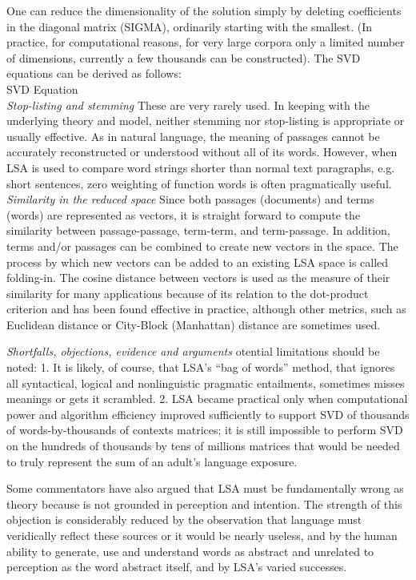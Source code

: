 One can reduce the dimensionality of the solution simply by deleting coefficients in the diagonal matrix (SIGMA), ordinarily starting with the smallest. (In practice, for computational reasons, for very large corpora only a limited number of dimensions, currently a few thousands can be constructed). The SVD equations can be derived as follows:\\

SVD Equation \\

\textit{Stop-listing and stemming}
These are very rarely used. In keeping with the underlying theory and model, neither stemming nor stop-listing is appropriate or usually effective. As in natural language, the meaning of passages cannot be accurately reconstructed or understood without all of its words. However, when LSA is used to compare word strings shorter than normal text paragraphs, e.g. short sentences, zero weighting of function words is often pragmatically useful.
\textit{Similarity in the reduced space}
Since both passages (documents) and terms (words) are represented as vectors, it is straight forward to compute the similarity between passage-passage, term-term, and term-passage. In addition, terms and/or passages can be combined to create new vectors in the space. The process by which new vectors can be added to an existing LSA space is called folding-in. The cosine distance between vectors is used as the measure of their similarity for many applications because of its relation to the dot-product criterion and has been found effective in practice, although other metrics, such as Euclidean distance or City-Block (Manhattan) distance are sometimes used.

\textit{Shortfalls, objections, evidence and arguments}
otential limitations should be noted:
1. It is likely, of course, that LSA's “bag of words” method, that ignores all syntactical, logical and nonlinguistic pragmatic entailments, sometimes misses meanings or gets it scrambled.
2. LSA became practical only when computational power and algorithm efficiency improved sufficiently to support SVD of thousands of words-by-thousands of contexts matrices; it is still impossible to perform SVD on the hundreds of thousands by tens of millions matrices that would be needed to truly represent the sum of an adult's language exposure.

Some commentators have also argued that LSA must be fundamentally wrong as theory because is not grounded in perception and intention. The strength of this objection is considerably reduced by the observation that language must veridically reflect these sources or it would be nearly useless, and by the human ability to generate, use and understand words as abstract and unrelated to perception as the word abstract itself, and by LSA’s varied successes.

